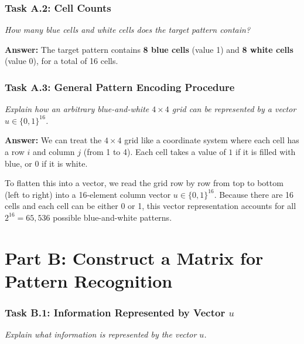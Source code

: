 \documentclass[11pt]{article}
\begin{document}
\vspace{0.8em}

\subsubsection*{Task A.2: Cell Counts}
\textit{How many blue cells and white cells does the target pattern contain?}

\vspace{0.4em}
\textbf{Answer:}
The target pattern contains \textbf{8 blue cells} (value 1) and \textbf{8 white cells} (value 0), for a total of 16 cells.

\vspace{0.5em}

\subsubsection*{Task A.3: General Pattern Encoding Procedure}
\textit{Explain how an arbitrary blue-and-white $4 \times 4$ grid can be represented by a vector $u \in \{0, 1\}^{16}$.}

\vspace{0.4em}
\textbf{Answer:}
We can treat the $4 \times 4$ grid like a coordinate system where each cell has a row $i$ and column $j$ (from 1 to 4). Each cell takes a value of $1$ if it is filled with blue, or $0$ if it is white.

To flatten this into a vector, we read the grid row by row from top to bottom (left to right) into a 16-element column vector $u \in \{0, 1\}^{16}$. Because there are 16 cells and each cell can be either 0 or 1, this vector representation accounts for all $2^{16} = 65,536$ possible blue-and-white patterns.

\vspace{1.5em}

\section*{Part B: Construct a Matrix for Pattern Recognition}

\subsubsection*{Task B.1: Information Represented by Vector $u$}
\textit{Explain what information is represented by the vector $u$.}
\end{document}

